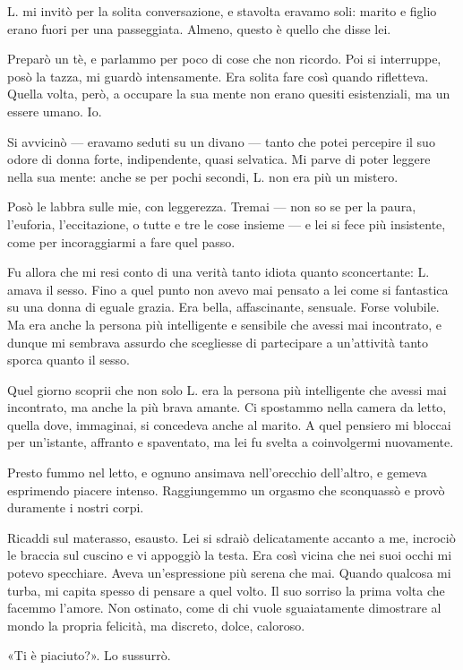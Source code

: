 \documentclass[a4paper,12pt]{book}
\begin{document}
L. mi invitò per la solita conversazione, e stavolta eravamo soli: marito e
figlio erano fuori per una passeggiata. Almeno, questo è quello che disse lei.

Preparò un tè, e parlammo per poco di cose che non ricordo. Poi si interruppe,
posò la tazza, mi guardò intensamente. Era solita fare così quando rifletteva.
Quella volta, però, a occupare la sua mente non erano quesiti esistenziali, ma
un essere umano. Io.

Si avvicinò --- eravamo seduti su un divano --- tanto che potei percepire il
suo odore di donna forte, indipendente, quasi selvatica. Mi parve di poter
leggere nella sua mente: anche se per pochi secondi, L. non era più un mistero.

Posò le labbra sulle mie, con leggerezza. Tremai --- non so se per la paura,
l'euforia, l'eccitazione, o tutte e tre le cose insieme --- e lei si fece più
insistente, come per incoraggiarmi a fare quel passo.

Fu allora che mi resi conto di una verità tanto idiota quanto sconcertante:
L. amava il sesso. Fino a quel punto non avevo mai pensato a lei come si
fantastica su una donna di eguale grazia. Era bella, affascinante, sensuale.
Forse volubile. Ma era anche la persona più intelligente e sensibile che avessi
mai incontrato, e dunque mi sembrava assurdo che scegliesse di partecipare a
un'attività tanto sporca quanto il sesso.

Quel giorno scoprii che non solo L. era la persona più intelligente che avessi
mai incontrato, ma anche la più brava amante. Ci spostammo nella camera da
letto, quella dove, immaginai, si concedeva anche al marito. A quel pensiero
mi bloccai per un'istante, affranto e spaventato, ma lei fu svelta a
coinvolgermi nuovamente.

Presto fummo nel letto, e ognuno ansimava nell'orecchio dell'altro, e gemeva
esprimendo piacere intenso. Raggiungemmo un orgasmo che sconquassò e provò
duramente i nostri corpi.

Ricaddi sul materasso, esausto. Lei si sdraiò delicatamente accanto a me,
incrociò le braccia sul cuscino e vi appoggiò la testa. Era così vicina che nei
suoi occhi mi potevo specchiare. Aveva un'espressione più serena che mai. Quando
qualcosa mi turba, mi capita spesso di pensare a quel volto. Il suo sorriso la
prima volta che facemmo l'amore. Non ostinato, come di chi vuole sguaiatamente
dimostrare al mondo la propria felicità, ma discreto, dolce, caloroso.

«Ti è piaciuto?». Lo sussurrò.
\end{document}

